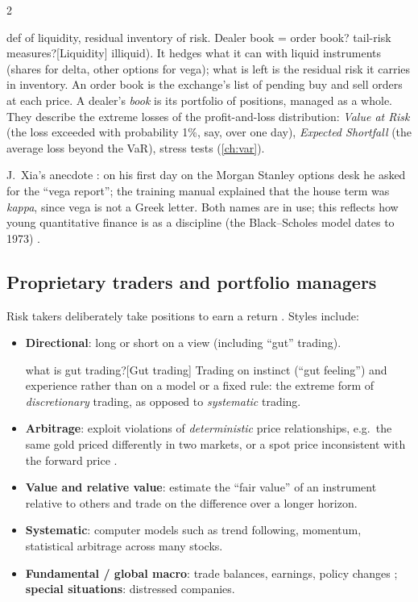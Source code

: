 \begin{paracol}{2}
\begin{answer}{def of liquidity, residual inventory of risk. Dealer book = order book? tail-risk measures?}[Liquidity]
        illiquid). It hedges what it can with liquid instruments (shares for delta, other options for
        vega); what is left is the residual risk it carries in inventory.
An order book is the exchange's list of pending buy
        and sell orders at each price. A dealer's \emph{book} is its portfolio of positions, managed
        as a whole.
They describe the extreme losses of the profit-and-loss distribution:
        \emph{Value at Risk} (the loss exceeded with probability 1\%, say, over one day),
        \emph{Expected Shortfall} (the average loss beyond the VaR), stress tests (\cref{ch:var}).
\end{answer}

\begin{coursenote}
J.~Xia's anecdote : on his first day on the Morgan Stanley options desk he asked
for the ``vega report''; the training manual explained that the house term was \emph{kappa},
since vega is not a Greek letter. Both names are in use; this reflects how young quantitative
finance is as a discipline (the Black--Scholes model dates to 1973) .
\end{coursenote}

\subsection{Proprietary traders and portfolio managers}
Risk takers deliberately take positions to earn a return . Styles include:
\begin{itemize}
  \item \textbf{Directional}: long or short on a view (including ``gut'' trading).
  \begin{answer}{what is gut trading?}[Gut trading]
Trading on instinct (``gut feeling'') and experience rather than on a model or a fixed rule: the
extreme form of \emph{discretionary} trading, as opposed to \emph{systematic} trading.
\end{answer}
  \item \textbf{Arbitrage}: exploit violations of \emph{deterministic} price relationships,
        e.g.\ the same gold priced differently in two markets, or a spot price inconsistent with
        the forward price .
  \item \textbf{Value and relative value}: estimate the ``fair value'' of an instrument relative
        to others and trade on the difference over a longer horizon.
  \item \textbf{Systematic}: computer models such as trend following, momentum,
        statistical arbitrage across many stocks.
  \item \textbf{Fundamental / global macro}: trade balances, earnings, policy changes
        ; \textbf{special situations}: distressed companies.
\end{itemize}


\end{paracol}
